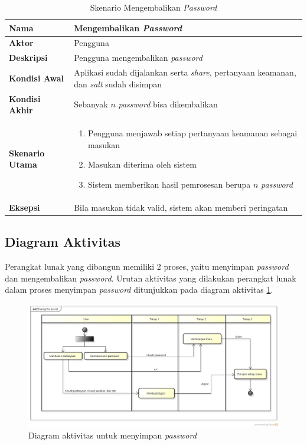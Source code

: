 \begin{table}[H]
	\centering
	\caption{Skenario Mengembalikan \textit{Password}} \label{table:scenario2}
	\begin{tabular}{|l|p{12cm}|}
		\hline
		\textbf{Nama} 					& Mengembalikan \textit{Password} 																									\\ \hline
		\textbf{Aktor}					& Pengguna																																					\\ \hline
		\textbf{Deskripsi} 			& Pengguna mengembalikan \textit{password} 																					\\ \hline
		\textbf{Kondisi Awal} 	& Aplikasi sudah dijalankan	serta \textit{share}, pertanyaan keamanan, dan \textit{salt} sudah disimpan  \\ \hline
		\textbf{Kondisi Akhir}	& Sebanyak $n$ \textit{password} bisa dikembalikan																	\\ \hline
		\textbf{Skenario Utama} & \begin{enumerate}[itemsep=0mm]\item Pengguna menjawab setiap pertanyaan keamanan sebagai masukan \item Masukan diterima oleh sistem \item Sistem memberikan hasil pemrosesan berupa $n$ \textit{password}\end{enumerate} \\ \hline
		\textbf{Eksepsi}				& Bila masukan tidak valid, sistem akan memberi peringatan \\ \hline
	\end{tabular}
\end{table}

\subsection{Diagram Aktivitas}

Perangkat lunak yang dibangun memiliki 2 proses, yaitu menyimpan \textit{password} dan mengembalikan \textit{password}. Urutan aktivitas yang dilakukan perangkat lunak dalam proses menyimpan \textit{password} ditunjukkan pada diagram aktivitas \ref{fig:activity1}.

\begin{figure}[H]
	\centerline{\includegraphics[scale=0.4]{Gambar/sharing-secret}}
	\caption{Diagram aktivitas untuk menyimpan \textit{password}}\label{fig:activity1}
\end{figure}

